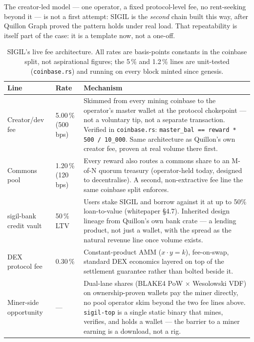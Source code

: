The creator-led model --- one operator, a fixed protocol-level fee, no rent-seeking beyond it --- is not a first attempt: SIGIL is the \emph{second} chain built this way, after Quillon Graph proved the pattern holds under real load. That repeatability is itself part of the case: it is a template now, not a one-off.

\begin{table}[h]
\centering
\small
\begin{tabular}{@{}p{3.4cm}p{2.6cm}p{8.4cm}@{}}
\toprule
\textbf{Line} & \textbf{Rate} & \textbf{Mechanism} \\
\midrule
Creator/dev fee & 5.00\,\% (500 bps) & Skimmed from every mining coinbase to the operator's master wallet at the protocol chokepoint --- not a voluntary tip, not a separate transaction. Verified in \texttt{coinbase.rs}: \texttt{master\_bal == reward * 500 / 10\_000}. Same architecture as Quillon's own creator fee, proven at real volume there first. \\
Commons pool & 1.20\,\% (120 bps) & Every reward also routes a commons share to an M-of-N quorum treasury (operator-held today, designed to decentralise). A second, non-extractive fee line the same coinbase split enforces. \\
sigil-bank credit vault & 50\,\% LTV & Users stake SIGIL and borrow against it at up to 50\% loan-to-value (whitepaper \S4.7). Inherited design lineage from Quillon's own bank crate --- a lending product, not just a wallet, with the spread as the natural revenue line once volume exists. \\
DEX protocol fee & 0.30\,\% & Constant-product AMM ($x\cdot y=k$), fee-on-swap, standard DEX economics layered on top of the settlement guarantee rather than bolted beside it. \\
Miner-side opportunity & --- & Dual-lane shares (BLAKE4 PoW $\times$ Wesolowski VDF) on ownership-proven wallets pay the miner directly, no pool operator skim beyond the two fee lines above. \texttt{sigil-top} is a single static binary that mines, verifies, and holds a wallet --- the barrier to a miner earning is a download, not a rig. \\
\bottomrule
\end{tabular}
\caption{SIGIL's live fee architecture. All rates are basis-points constants in the coinbase split, not aspirational figures; the 5\,\% and 1.2\,\% lines are unit-tested (\texttt{coinbase.rs}) and running on every block minted since genesis.}
\label{tab:revenue}
\end{table}

